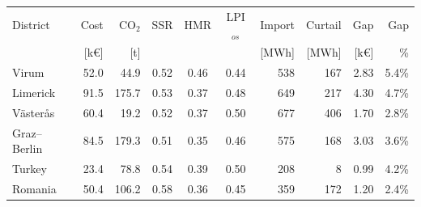 \begin{tabular}{lrrcccrrrr}
\toprule
District & Cost & CO$_2$ & SSR & HMR & LPI$_{os}$ & Import & Curtail & Gap & Gap \\
 & [k\euro] & [t] & & & & [MWh] & [MWh] & [k\euro] & \% \\
\midrule
Virum & 52.0 & 44.9 & 0.52 & 0.46 & 0.44 & 538 & 167 & 2.83 & 5.4\% \\
Limerick & 91.5 & 175.7 & 0.53 & 0.37 & 0.48 & 649 & 217 & 4.30 & 4.7\% \\
V\"aster\aa s & 60.4 & 19.2 & 0.52 & 0.37 & 0.50 & 677 & 406 & 1.70 & 2.8\% \\
Graz--Berlin & 84.5 & 179.3 & 0.51 & 0.35 & 0.46 & 575 & 168 & 3.03 & 3.6\% \\
Turkey & 23.4 & 78.8 & 0.54 & 0.39 & 0.50 & 208 & 8 & 0.99 & 4.2\% \\
Romania & 50.4 & 106.2 & 0.58 & 0.36 & 0.45 & 359 & 172 & 1.20 & 2.4\% \\
\bottomrule
\end{tabular}
